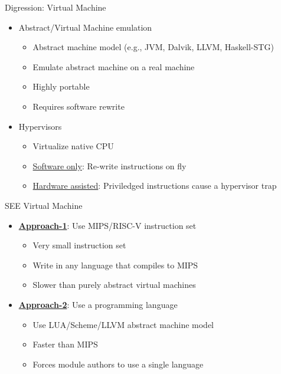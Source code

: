 \documentclass[handout,xcolor=svgnames]{beamer}
\newcommand{\hicolor}{darkorange}
\newcommand{\imp}[1]{\begin{center}\Large{\color{\hicolor}{#1}}\end{center}}
\newcommand{\pointout}[1]{{\underline{\textbf{#1}}}}
\begin{document}
\begin{frame}
  {Digression: Virtual Machine}

  \begin{itemize}
      \item Abstract/Virtual Machine emulation
      \begin{itemize}
          \item Abstract machine model (e.g., JVM, Dalvik, LLVM, Haskell-STG)
          \item Emulate abstract machine on a real machine
          \item Highly portable
          \item Requires software rewrite
      \end{itemize}
      \item Hypervisors
      \begin{itemize}
          \item Virtualize native CPU
          \item \underline{Software only}: Re-write instructions on fly
          \item \underline{Hardware assisted}: Priviledged instructions cause a hypervisor trap
      \end{itemize}
    \end{itemize}
\end{frame}


\begin{frame}
  {SEE Virtual Machine}
  \imp{Abstract Machine Emulation better suited for SEE}

  \begin{itemize}
      \item \pointout{Approach-1}: Use MIPS/RISC-V instruction set
      \begin{itemize}
          \item Very small instruction set
          \item Write in any language that compiles to MIPS
          \item Slower than purely abstract virtual machines
      \end{itemize}
      \item \pointout{Approach-2}: Use a programming language
      \begin{itemize}
          \item Use LUA/Scheme/LLVM abstract machine model
          \item Faster than MIPS
          \item Forces module authors to use a single language
      \end{itemize}
      \end{itemize}
\end{frame}
\end{document}
